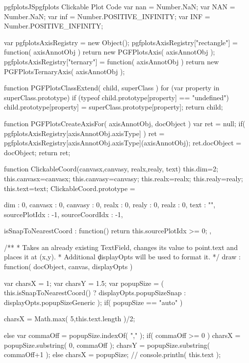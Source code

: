 \begin{insDLJS}[processAnnotatedPlot]{pgfplotsJS}{pgfplots Clickable Plot Code}
var nan = Number.NaN;
var NAN = Number.NaN;
var inf = Number.POSITIVE_INFINITY;
var INF = Number.POSITIVE_INFINITY;

var pgfplotsAxisRegistry = new Object();
pgfplotsAxisRegistry["rectangle"]	= function( axisAnnotObj ) { return new PGFPlotsAxis( axisAnnotObj ); }
pgfplotsAxisRegistry["ternary"]		= function( axisAnnotObj ) { return new PGFPlotsTernaryAxis( axisAnnotObj ); }

function PGFPlotsClassExtend( child, superClass )
{
	for (var property in superClass.prototype) {
		if (typeof child.prototype[property] == "undefined")
			child.prototype[property] = superClass.prototype[property];
	}
	return child;
}

function PGFPlotsCreateAxisFor( axisAnnotObj, docObject )
{
	var ret = null;
	if( pgfplotsAxisRegistry[axisAnnotObj.axisType] ) {
		ret = pgfplotsAxisRegistry[axisAnnotObj.axisType](axisAnnotObj);
		ret.docObject = docObject;
	}
	return ret;
}

function ClickableCoord(canvasx,canvasy, realx,realy, text)
{
	this.dim=2;
	this.canvasx=canvasx;
	this.canvasy=canvasy;
	this.realx=realx;
	this.realy=realy;
	this.text=text;
}
ClickableCoord.prototype =
{
	dim : 0,
	canvasx : 0,
	canvasy : 0,
	realx : 0,
	realy : 0,
	realz : 0,
	text : "",
	sourcePlotIdx : -1,
	sourceCoordIdx : -1,

	isSnapToNearestCoord : function() {
		return this.sourcePlotIdx >= 0;
	},

	/**
	 * Takes an already existing TextField, changes its value to point.text and places it at (x,y).
	 * Additional \c displayOpts will be used to format it.
	 */
	draw : function( docObject, canvas, displayOpts )
	{
		var charsX = 1;
		var charsY = 1.5;
		var popupSize = ( this.isSnapToNearestCoord() ? displayOpts.popupSizeSnap : displayOpts.popupSizeGeneric );
		if( popupSize == "auto" ) {
			charsX = Math.max( 5,this.text.length )/2;

		} else {
			var commaOff = popupSize.indexOf( "," );
			if( commaOff >= 0 ) {
				charsX = popupSize.substring( 0, commaOff );
				charsY = popupSize.substring( commaOff+1 );
			} else
				charsX = popupSize;
		}
	//	console.println( this.text );

}}
\end{insDLJS}
